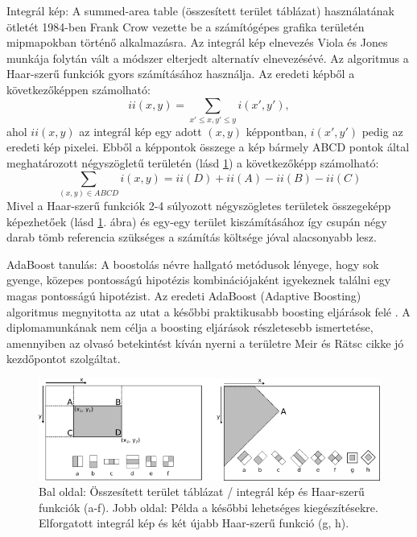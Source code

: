 Integrál kép: 
A summed-area table (összesített terület táblázat) használatának ötletét 1984-ben Frank Crow vezette be a számítógépes grafika területén \cite{crow_summed-area_1984} mipmapokban történő alkalmazásra. Az integrál kép elnevezés Viola és Jones munkája folytán vált a módszer elterjedt alternatív elnevezésévé. Az algoritmus a Haar-szerű funkciók gyors számításához használja. Az eredeti képből a következőképpen számolható:
\begin{equation}
    ii(x, y) = \sum_{x' \leq x, y' \leq y} i(x', y'),
\end{equation}
ahol $ii(x, y)$ az integrál kép egy adott $(x, y)$ képpontban, $i(x', y')$ pedig az eredeti kép pixelei. Ebből a képpontok összege a kép bármely ABCD pontok által meghatározott négyszögletű területén (lásd \ref{fig:integral_image_and_haar-like_features}) a következőképp számolható:
\begin{equation}
    \sum_{(x, y) \in ABCD} i(x, y) = ii(D) + ii(A) - ii(B) - ii(C)
\end{equation}
Mivel a Haar-szerű funkciók 2-4 súlyozott négyszögletes területek összegeképp képezhetőek (lásd \ref{fig:integral_image_and_haar-like_features}. ábra) és egy-egy terület kiszámításához így csupán négy darab tömb referencia szükséges a számítás költsége jóval alacsonyabb lesz.

AdaBoost tanulás:
A boostolás névre hallgató metódusok lényege, hogy sok gyenge, közepes pontosságú hipotézis kombinációjaként igyekeznek találni egy magas pontosságú hipotézist. Az eredeti AdaBoost (Adaptive Boosting) \cite{freund_decision-theoretic_1997} algoritmus megnyitotta az utat a későbbi praktikusabb boosting eljárások felé \cite{freund_decision-theoretic_1997}. A diplomamunkának nem célja a boosting eljárások részletesebb ismertetése, amennyiben az olvasó betekintést kíván nyerni a területre Meir és R{\"a}tsc cikke \cite{meir_introduction_2003} jó kezdőpontot szolgáltat.

\begin{figure}
    \centering
    \includegraphics[width=\linewidth]{figures/integral_img_and_haar.png}
    \caption{Bal oldal: Összesített terület táblázat / integrál kép és Haar-szerű funkciók (a-f). Jobb oldal: Példa a későbbi lehetséges kiegészítésekre. Elforgatott integrál kép és két újabb Haar-szerű funkció (g, h).}
    \label{fig:integral_image_and_haar-like_features}
\end{figure}

